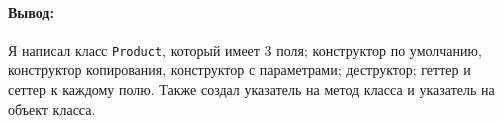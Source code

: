 \paragraph{Вывод:}
Я написал класс \texttt{Product}, который имеет 3 поля;
конструктор по умолчанию, конструктор копирования, конструктор с параметрами;
деструктор;
геттер и сеттер к каждому полю.
Также создал указатель на метод класса и указатель на объект класса.
